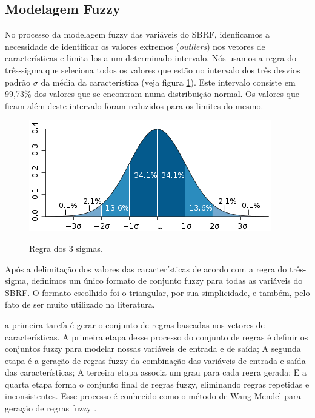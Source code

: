 \subsection{Modelagem Fuzzy}

No processo da modelagem fuzzy das variáveis do SBRF, idenficamos a necessidade de identificar os valores extremos (\textit{outliers}) nos vetores de características e limita-los a um determinado intervalo.  Nós usamos a regra do três-sigma \cite{kazmier2004schaum} que seleciona todos os valores que estão no intervalo dos três desvios padrão $\sigma$ da média da característica (veja figura \ref{figura:regra_3_sigmas}). Este intervalo consiste em 99,73\% dos valores que se encontram numa distribuição normal. Os valores que ficam além deste intervalo foram reduzidos para os limites do mesmo.

\begin{figure}[h]
\caption{Regra dos 3 sigmas.}
\centering
\includegraphics[scale=0.85]{regra-dos-3-sigma.png}
\label{figura:regra_3_sigmas}
\end{figure}

Após a delimitação dos valores das características de acordo com a regra do três-sigma, definimos um único formato de conjunto fuzzy para todas as variáveis do SBRF. O formato escolhido foi o triangular, por sua simplicidade, e também, pelo fato de ser muito utilizado na literatura.

a primeira tarefa é gerar o conjunto de regras baseadas nos vetores de características. A primeira etapa desse processo do conjunto de regras é definir os conjuntos fuzzy para modelar nossas variáveis de entrada e de saída;  A segunda etapa é a geração de regras fuzzy da combinação das variáveis de entrada e saída das características; A terceira etapa associa um grau para cada regra gerada; E a quarta etapa forma o conjunto final de regras fuzzy, eliminando regras repetidas e inconsistentes. Esse processo é conhecido como o método de Wang-Mendel para geração de regras fuzzy \cite{wang1992generating}.

